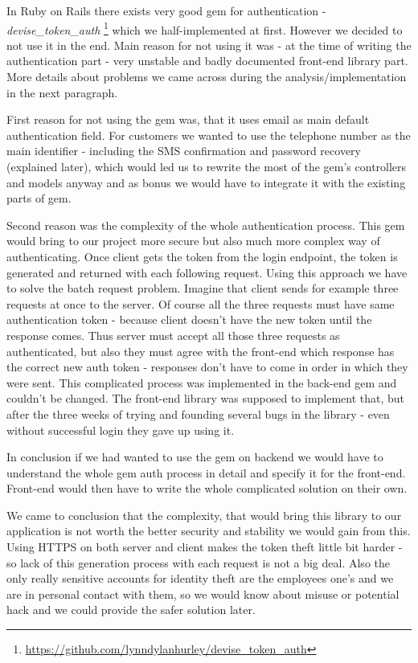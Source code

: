 In Ruby on Rails there exists very good gem for authentication - \textit{devise\_token\_auth} \footnote{\url{https://github.com/lynndylanhurley/devise\_token\_auth}} which we half-implemented at first. However we decided to not use it in the end. Main reason for not using it was - at the time of writing the authentication part - very unstable and badly documented front-end library part. More details about problems we came across during the analysis/implementation in the next paragraph.

First reason for not using the gem was, that it uses email as main default authentication field. For customers we wanted to use the telephone number as the main identifier - including the SMS confirmation and password recovery (explained later), which would led us to rewrite the most of the gem's controllers and models anyway and as bonus we would have to integrate it with the existing parts of gem.

Second reason was the complexity of the whole authentication process. This gem would bring to our project more secure but also much more complex way of authenticating. Once client gets the token from the login endpoint, the token is generated and returned with each following request. Using this approach we have to solve the batch request problem. Imagine that client sends for example three requests at once to the server. Of course all the three requests must have same authentication token - because client doesn't have the new token until the response comes. Thus server must accept all those three requests as authenticated, but also they must agree with the front-end which response has the correct new auth token - responses don't have to come in order in which they were sent. This complicated process was implemented in the back-end gem and couldn't be changed. The front-end library was supposed to implement that, but after the three weeks of trying and founding several bugs in the library - even without successful login they gave up using it.

In conclusion if we had wanted to use the gem on backend we would have to understand the whole gem auth process in detail and specify it for the front-end. Front-end would then have to write the whole complicated solution on their own. 

We came to conclusion that the complexity, that would bring this library to our application is not worth the better security and stability we would gain from this. Using HTTPS on both server and client makes the token theft little bit harder - so lack of this generation process with each request is not a big deal. Also the only really sensitive accounts for identity theft are the employees one's and we are in personal contact with them, so we would know about misuse or potential hack and we could provide the safer solution later.

